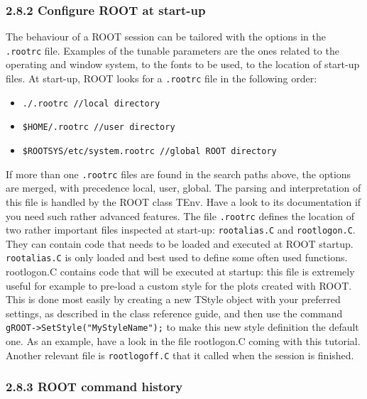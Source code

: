 \documentclass{article}
\providecommand{\tightlist}{%
      \setlength{\itemsep}{0pt}\setlength{\parskip}{0pt}}
\begin{document}
\subsubsection{2.8.2 Configure ROOT at
start-up}\label{configure-root-at-start-up}

The behaviour of a ROOT session can be tailored with the options in the
\texttt{.rootrc} file. Examples of the tunable parameters are the ones
related to the operating and window system, to the fonts to be used, to
the location of start-up files. At start-up, ROOT looks for a
\texttt{.rootrc} file in the following order:

\begin{itemize}
\tightlist
\item
  \texttt{./.rootrc\ //local\ directory}
\item
  \texttt{\$HOME/.rootrc\ //user\ directory}
\item
  \texttt{\$ROOTSYS/etc/system.rootrc\ //global\ ROOT\ directory}
\end{itemize}

If more than one \texttt{.rootrc} files are found in the search paths
above, the options are merged, with precedence local, user, global. The
parsing and interpretation of this file is handled by the ROOT class
TEnv. Have a look to its documentation if you need such rather advanced
features. The file \texttt{.rootrc} defines the location of two rather
important files inspected at start-up: \texttt{rootalias.C} and
\texttt{rootlogon.C}. They can contain code that needs to be loaded and
executed at ROOT startup. \texttt{rootalias.C} is only loaded and best
used to define some often used functions. rootlogon.C contains code that
will be executed at startup: this file is extremely useful for example
to pre-load a custom style for the plots created with ROOT. This is done
most easily by creating a new TStyle object with your preferred
settings, as described in the class reference guide, and then use the
command \texttt{gROOT-\textgreater{}SetStyle("MyStyleName");} to make
this new style definition the default one. As an example, have a look in
the file rootlogon.C coming with this tutorial. Another relevant file is
\texttt{rootlogoff.C} that it called when the session is finished.

\subsubsection{2.8.3 ROOT command history}\label{root-command-history}
\end{document}
